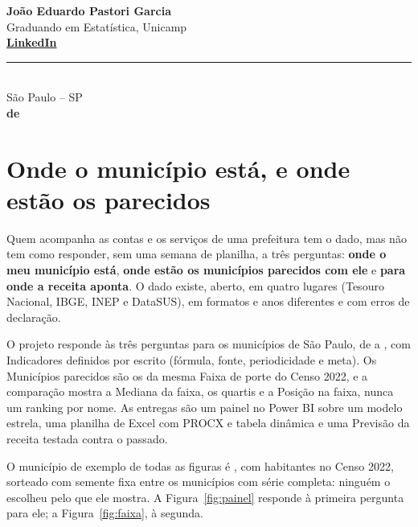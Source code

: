 \documentclass[11pt,a4paper]{article}
\newcommand{\AutorNome}{João Eduardo Pastori Garcia}
\newcommand{\AutorPapel}{Graduando em Estatística, Unicamp}
\newcommand{\AutorLinkedIn}{https://www.linkedin.com/in/joao-eduardo-garcia/}
\newcommand{\LocalCapa}{São Paulo -- SP}
\newcommand{\DataCapa}{\NumMesCapa{} de \NumAnoCapa}
\begin{document}
\begin{titlepage}
  \begin{minipage}{0.85\textwidth}
    \centering
    {\large\bfseries \AutorNome} \\
    {\normalsize\color{tinta2} \AutorPapel} \\[0.15cm]
    {\footnotesize
     \href{\AutorLinkedIn}{\color{vermelho}\textbf{LinkedIn}}}
  \end{minipage}

  \vfill

  {\color{tinta2}\rule{4cm}{0.5pt}} \\[0.3cm]
  {\small\color{tinta2} \LocalCapa \\ \bfseries \DataCapa}
\end{titlepage}

\tableofcontents
\clearpage

\section{Onde o município está, e onde estão os parecidos}
\label{sec:problema}

Quem acompanha as contas e os serviços de uma prefeitura tem o dado, mas
não tem como responder, sem uma semana de planilha, a três perguntas:
\textbf{onde o meu município está}, \textbf{onde estão os municípios
parecidos com ele} e \textbf{para onde a receita aponta}. O dado existe,
aberto, em quatro lugares (Tesouro Nacional, IBGE, INEP e DataSUS), em
formatos e anos diferentes e com erros de declaração.

O projeto responde às três perguntas para os \NumMunicipios{} municípios
de São Paulo, de \NumAnoInicial{} a \NumAnoFinal, com \NumIndicadores{}
Indicadores definidos por escrito (fórmula, fonte, periodicidade e meta).
Os Municípios parecidos são os da mesma Faixa de porte do Censo 2022, e a
comparação mostra a Mediana da faixa, os quartis e a Posição na faixa,
nunca um ranking por nome. As entregas são um painel no Power BI sobre um
modelo estrela, uma planilha de Excel com PROCX e tabela dinâmica e uma
Previsão da receita testada contra o passado.

O município de exemplo de todas as figuras é \NumExemplo{}, com
\NumExemploPopulacao{} habitantes no Censo 2022, sorteado com semente fixa
entre os \NumExemploCandidatos{} municípios com série completa: ninguém o
escolheu pelo que ele mostra. A Figura~\ref{fig:painel} responde à
primeira pergunta para ele; a Figura~\ref{fig:faixa}, à segunda.
\end{document}
